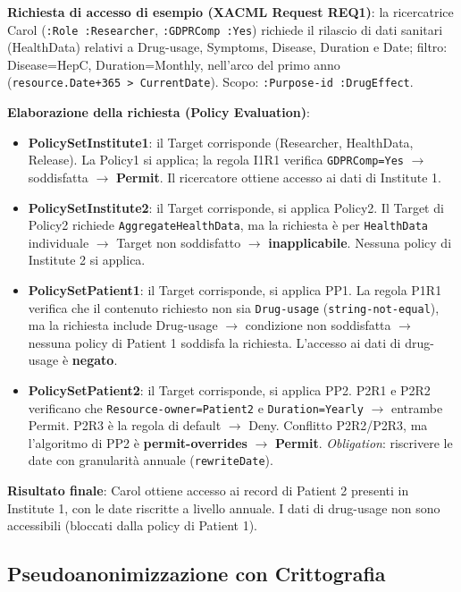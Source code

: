 \documentclass[a4paper,11pt]{article}
\begin{document}
\begin{esempio}
\textbf{Richiesta di accesso di esempio (XACML Request REQ1)}: la ricercatrice Carol (\texttt{:Role :Researcher}, \texttt{:GDPRComp :Yes}) richiede il rilascio di dati sanitari (HealthData) relativi a Drug-usage, Symptoms, Disease, Duration e Date; filtro: Disease=HepC, Duration=Monthly, nell'arco del primo anno (\texttt{resource.Date+365 > CurrentDate}). Scopo: \texttt{:Purpose-id :DrugEffect}.

\textbf{Elaborazione della richiesta (Policy Evaluation)}:
\begin{itemize}
  \item \textbf{PolicySetInstitute1}: il Target corrisponde (Researcher, HealthData, Release). La Policy1 si applica; la regola I1R1 verifica \texttt{GDPRComp=Yes} $\to$ soddisfatta $\to$ \textbf{Permit}. Il ricercatore ottiene accesso ai dati di Institute 1.
  \item \textbf{PolicySetInstitute2}: il Target corrisponde, si applica Policy2. Il Target di Policy2 richiede \texttt{AggregateHealthData}, ma la richiesta \`{e} per \texttt{HealthData} individuale $\to$ Target non soddisfatto $\to$ \textbf{inapplicabile}. Nessuna policy di Institute 2 si applica.
  \item \textbf{PolicySetPatient1}: il Target corrisponde, si applica PP1. La regola P1R1 verifica che il contenuto richiesto non sia \texttt{Drug-usage} (\texttt{string-not-equal}), ma la richiesta include Drug-usage $\to$ condizione non soddisfatta $\to$ nessuna policy di Patient 1 soddisfa la richiesta. L'accesso ai dati di drug-usage \`{e} \textbf{negato}.
  \item \textbf{PolicySetPatient2}: il Target corrisponde, si applica PP2. P2R1 e P2R2 verificano che \texttt{Resource-owner=Patient2} e \texttt{Duration=Yearly} $\to$ entrambe Permit. P2R3 \`{e} la regola di default $\to$ Deny. Conflitto P2R2/P2R3, ma l'algoritmo di PP2 \`{e} \textbf{permit-overrides} $\to$ \textbf{Permit}. \emph{Obligation}: riscrivere le date con granularit\`{a} annuale (\texttt{rewriteDate}).
\end{itemize}

\textbf{Risultato finale}: Carol ottiene accesso ai record di Patient 2 presenti in Institute 1, con le date riscritte a livello annuale. I dati di drug-usage non sono accessibili (bloccati dalla policy di Patient 1).
\end{esempio}

\subsection{Pseudoanonimizzazione con Crittografia}
\end{document}
